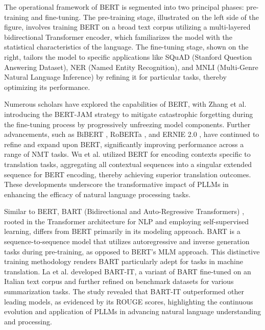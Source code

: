 \documentclass[acmsmall]{acmart}
\begin{document}
The operational framework of BERT is segmented into two principal phases: pre-training and fine-tuning. The pre-training stage, illustrated on the left side of the figure, involves training BERT on a broad text corpus utilizing a multi-layered bidirectional Transformer encoder, which familiarizes the model with the statistical characteristics of the language. The fine-tuning stage, shown on the right, tailors the model to specific applications like SQuAD (Stanford Question Answering Dataset), NER (Named Entity Recognition), and MNLI (Multi-Genre Natural Language Inference) by refining it for particular tasks, thereby optimizing its performance.


Numerous scholars have explored the capabilities of BERT, with Zhang et al. \cite{Zhebin} introducing the BERT-JAM strategy to mitigate catastrophic forgetting during the fine-tuning process by progressively unfreezing model components. Further advancements, such as BiBERT \cite{Haoran}, RoBERTa \cite{Yinhan}, and ERNIE 2.0 \cite{Yu}, have continued to refine and expand upon BERT, significantly improving performance across a range of NMT tasks. Wu et al. \cite{Xueqing} utilized BERT for encoding contexts specific to translation tasks, aggregating all contextual sequences into a singular extended sequence for BERT encoding, thereby achieving superior translation outcomes. These developments underscore the transformative impact of PLLMs in enhancing the efficacy of natural language processing tasks.

Similar to BERT, BART (Bidirectional and Auto-Regressive Transformers) \cite{Mike}, rooted in the Transformer architecture for NLP and employing self-supervised learning, differs from BERT primarily in its modeling approach. BART is a sequence-to-sequence model that utilizes autoregressive and inverse generation tasks during pre-training, as opposed to BERT's MLM approach. This distinctive training methodology renders BART particularly adept for tasks in machine translation. La et al. \cite{Moreno} developed BART-IT, a variant of BART fine-tuned on an Italian text corpus and further refined on benchmark datasets for various summarization tasks. The study revealed that BART-IT outperformed other leading models, as evidenced by its ROUGE scores, highlighting the continuous evolution and application of PLLMs in advancing natural language understanding and processing.
\end{document}
